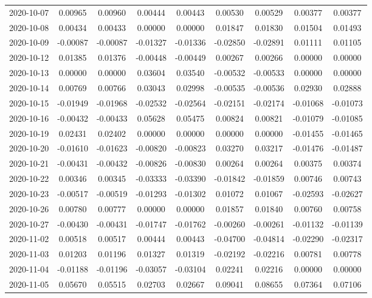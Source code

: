 {\begin{footnotesize}
\begin{longtable}{lcccccccc}
2020-10-07 & 0.00965 & 0.00960 & 0.00444 & 0.00443 & 0.00530 & 0.00529 & 0.00377 & 0.00377 \\
2020-10-08 & 0.00434 & 0.00433 & 0.00000 & 0.00000 & 0.01847 & 0.01830 & 0.01504 & 0.01493 \\
2020-10-09 & -0.00087 & -0.00087 & -0.01327 & -0.01336 & -0.02850 & -0.02891 & 0.01111 & 0.01105 \\
2020-10-12 & 0.01385 & 0.01376 & -0.00448 & -0.00449 & 0.00267 & 0.00266 & 0.00000 & 0.00000 \\
2020-10-13 & 0.00000 & 0.00000 & 0.03604 & 0.03540 & -0.00532 & -0.00533 & 0.00000 & 0.00000 \\
2020-10-14 & 0.00769 & 0.00766 & 0.03043 & 0.02998 & -0.00535 & -0.00536 & 0.02930 & 0.02888 \\
2020-10-15 & -0.01949 & -0.01968 & -0.02532 & -0.02564 & -0.02151 & -0.02174 & -0.01068 & -0.01073 \\
2020-10-16 & -0.00432 & -0.00433 & 0.05628 & 0.05475 & 0.00824 & 0.00821 & -0.01079 & -0.01085 \\
2020-10-19 & 0.02431 & 0.02402 & 0.00000 & 0.00000 & 0.00000 & 0.00000 & -0.01455 & -0.01465 \\
2020-10-20 & -0.01610 & -0.01623 & -0.00820 & -0.00823 & 0.03270 & 0.03217 & -0.01476 & -0.01487 \\
2020-10-21 & -0.00431 & -0.00432 & -0.00826 & -0.00830 & 0.00264 & 0.00264 & 0.00375 & 0.00374 \\
2020-10-22 & 0.00346 & 0.00345 & -0.03333 & -0.03390 & -0.01842 & -0.01859 & 0.00746 & 0.00743 \\
2020-10-23 & -0.00517 & -0.00519 & -0.01293 & -0.01302 & 0.01072 & 0.01067 & -0.02593 & -0.02627 \\
2020-10-26 & 0.00780 & 0.00777 & 0.00000 & 0.00000 & 0.01857 & 0.01840 & 0.00760 & 0.00758 \\
2020-10-27 & -0.00430 & -0.00431 & -0.01747 & -0.01762 & -0.00260 & -0.00261 & -0.01132 & -0.01139 \\
2020-11-02 & 0.00518 & 0.00517 & 0.00444 & 0.00443 & -0.04700 & -0.04814 & -0.02290 & -0.02317 \\
2020-11-03 & 0.01203 & 0.01196 & 0.01327 & 0.01319 & -0.02192 & -0.02216 & 0.00781 & 0.00778 \\
2020-11-04 & -0.01188 & -0.01196 & -0.03057 & -0.03104 & 0.02241 & 0.02216 & 0.00000 & 0.00000 \\
2020-11-05 & 0.05670 & 0.05515 & 0.02703 & 0.02667 & 0.09041 & 0.08655 & 0.07364 & 0.07106 \\

\end{longtable}
\end{footnotesize}}

